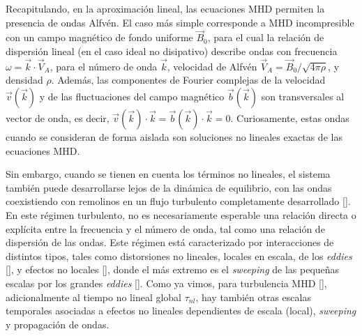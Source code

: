 Recapitulando, en la aproximación lineal, las ecuaciones MHD permiten
la presencia de ondas Alfv\'en. El caso más simple corresponde a MHD
incompresible con un campo magnético de fondo uniforme $\vec{B}_0$,
para el cual la relación de dispersión lineal (en el caso ideal no
disipativo) describe ondas con frecuencia $ \omega =
\vec{k}\cdot\vec{V}_A$, para el número de onda $\vec{k}$, velocidad de
Alfv\'en $\vec{V}_A = \vec{B}_0 / \sqrt{4\pi\rho}$, y densidad
$\rho$. Además, las componentes de Fourier complejas de la velocidad
$\vec{v}(\vec{k})$ y de las fluctuaciones del campo magnético
$\vec{b}(\vec{k})$ son transversales al vector de onda, es decir,
$\vec{v}(\vec{k}) \cdot \vec{k} = \vec{b}(\vec{k}) \cdot \vec{k} =
0$. Curiosamente, estas ondas cuando se consideran de forma aislada
son soluciones no lineales exactas de las ecuaciones MHD.

Sin embargo, cuando se tienen en cuenta los términos no lineales, el
sistema también puede desarrollarse lejos de la dinámica de
equilibrio, con las ondas coexistiendo con remolinos en un flujo
turbulento completamente desarrollado [\cite{dmitruk_waves_2009}].  En
este régimen turbulento, no es necesariamente esperable una relación
directa o explícita entre la frecuencia y el número de onda, tal como
una relación de dispersión de las ondas.  Este régimen está
caracterizado por interacciones de distintos tipos, tales como
distorsiones no lineales, locales en escala, de los \textit{eddies}
[\cite{monin_statistical_2013, kolmogorov_local_1941,
    mccomb_physics_1992}], y efectos no locales
[\cite{alexakis_turbulent_2007, alexakis_anisotropic_2007,
    teaca_energy_2009, mininni_scale_2011}], donde el más extremo es
el \textit{sweeping} de las pequeñas escalas por los grandes
\textit{eddies} [\cite{kraichnan_structure_1959,
    tennekes_eulerian_1975, chen_sweeping_1989, nelkin_time_1990}].
Como ya vimos, para turbulencia MHD [\cite{pouquet_strong_1976,
    zhou_magnetohydrodynamic_2004}], adicionalmente al tiempo no
lineal global $\tau_{nl}$, hay también otras escalas temporales
asociadas a efectos no lineales dependientes de escala (local),
\textit{sweeping} y propagación de ondas.


